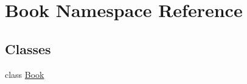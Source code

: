 \hypertarget{namespace_book}{}\section{Book Namespace Reference}
\label{namespace_book}
\subsection*{Classes}
\begin{DoxyCompactItemize}
\item 
class \hyperlink{class_book_1_1_book}{Book}
\end{DoxyCompactItemize}
